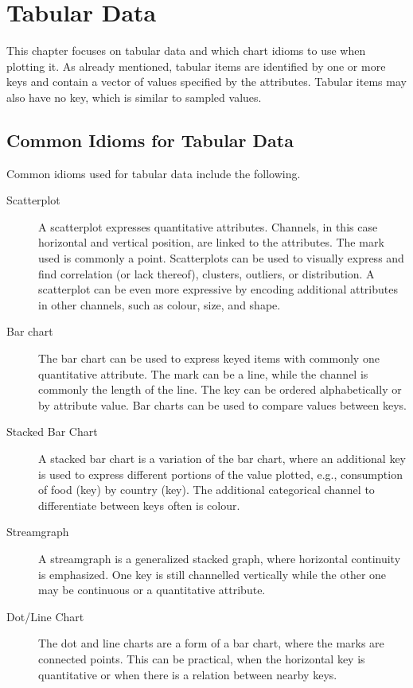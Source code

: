 \chapter{Tabular Data}
This chapter focuses on tabular data and which chart idioms to use when plotting it.
As already mentioned, tabular items are identified by one or more keys and contain a vector of values specified by the attributes.
Tabular items may also have no key, which is similar to sampled values.

\section{Common Idioms for Tabular Data}
Common idioms used for tabular data include the following.
\begin{description}
    \item[Scatterplot] A scatterplot expresses quantitative attributes.
        Channels, in this case horizontal and vertical position, are linked to the attributes.
        The mark used is commonly a point.
        Scatterplots can be used to visually express and find correlation (or lack thereof), clusters, outliers, or distribution.
        A scatterplot can be even more expressive by encoding additional attributes in other channels, such as colour, size, and shape.

    \item[Bar chart] The bar chart can be used to express keyed items with commonly one quantitative attribute.
        The mark can be a line, while the channel is commonly the length of the line.
        The key can be ordered alphabetically or by attribute value.
        Bar charts can be used to compare values between keys.
    
    \item[Stacked Bar Chart] A stacked bar chart is a variation of the bar chart, where an additional key is used to express different portions of the value plotted, e.g., consumption of food (key) by country (key).
        The additional categorical channel to differentiate between keys often is colour.

    \item[Streamgraph] A streamgraph is a generalized stacked graph, where horizontal continuity is emphasized.
        One key is still channelled vertically while the other one may be continuous or a quantitative attribute.
    
    \item[Dot/Line Chart] The dot and line charts are a form of a bar chart, where the marks are connected points.
        This can be practical, when the horizontal key is quantitative or when there is a relation between nearby keys.
    

\end{description}
